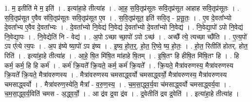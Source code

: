 \documentclass[17pt]{extarticle}
\begin{document}
1. म॒ इतीति॑ मे म॒ इति॑ । . इत्या॑हा॒हे तीत्या॑ह । . आ॒ह॒ स॒वि॒तृप्र॑सूतः सवि॒तृप्र॑सूत आहाह सवि॒तृप्र॑सूतः । . स॒वि॒तृप्र॑सूत ए॒वैव स॑वि॒तृप्र॑सूतः सवि॒तृप्र॑सूत ए॒व । . स॒वि॒तृप्र॑सूत॒ इति॑ सवि॒तृ - प्र॒सू॒तः॒ । . ए॒व दे॒वता᳚भ्यो दे॒वता᳚भ्य ए॒वैव दे॒वता᳚भ्यः । . दे॒वता᳚भ्यो नि॒वेद्य॑ नि॒वेद्य॑ दे॒वता᳚भ्यो दे॒वता᳚भ्यो नि॒वेद्य॑ । . नि॒वेद्या॒पो॑ ऽपो नि॒वेद्य॑ नि॒वेद्या॒पः । . नि॒वेद्येति॑ नि - वेद्य॑ । . अ॒पो ऽच्छा च्छा॒पो॑ ऽपो ऽच्छ॑ । . अच्छै᳚ त्ये॒ त्यच्छा च्छै॑ति । . ए॒त्य॒पो॑ ऽप ए᳚त्ये त्य॒पः । . अ॒प इ॑ष्ये ष्या॒पो॑ ऽप इ॑ष्य । . इ॒ष्य॒ हो॒त॒र्॒. हो॒त॒ रि॒ष्ये॒ ष्य॒ हो॒तः॒ । . हो॒त॒ रितीति॑ होतर्. होत॒ रिति॑ । . इत्या॑हा॒हे तीत्या॑ह । . आ॒हे॒ षि॒त मि॑षि॒त मा॑हाहे षि॒तम् । . इ॒षि॒तꣳ हि हीषि॒त मि॑षि॒तꣳ हि । . हि कर्म॒ कर्म॒ हि हि कर्म॑ । . कर्म॑ क्रि॒यते᳚ क्रि॒यते॒ कर्म॒ कर्म॑ क्रि॒यते᳚ । . क्रि॒यते॒ मैत्रा॑वरुणस्य॒ मैत्रा॑वरुणस्य क्रि॒यते᳚ क्रि॒यते॒ मैत्रा॑वरुणस्य । . मैत्रा॑वरुणस्य चमसाद्ध्वर्यो चमसाद्ध्वर्यो॒ मैत्रा॑वरुणस्य॒ मैत्रा॑वरुणस्य चमसाद्ध्वर्यो । . मैत्रा॑वरुण॒स्येति॒ मैत्रा᳚ - व॒रु॒ण॒स्य॒ । . च॒म॒सा॒द्ध्व॒र्य॒वा च॑मसाद्ध्वर्यो चमसाद्ध्वर्य॒वा । . च॒म॒सा॒द्ध्व॒र्य॒विति॑ चमस - अ॒द्ध्व॒र्यो॒ । . आ द्र॑व द्र॒वा द्र॑व । . द्र॒वेतीति॑ द्रव द्र॒वेति॑ । . इत्या॑हा॒हे तीत्या॑ह । \newline
\end{document}
